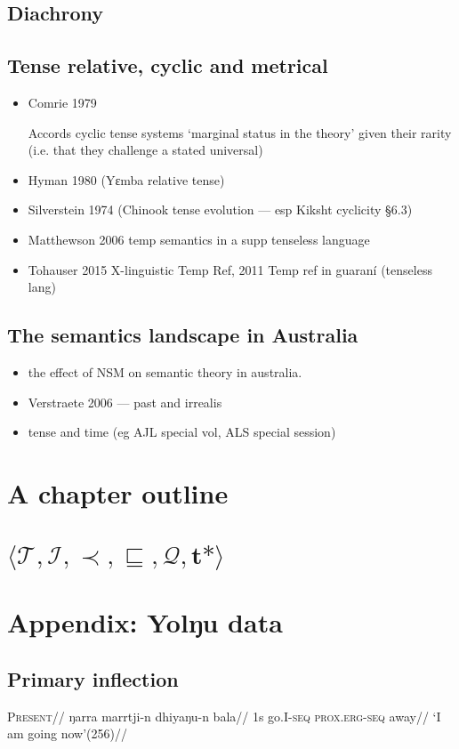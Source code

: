 \documentclass[12pt]{article}
\begin{document}
	\subsection{Diachrony}
	\subsection{Tense relative, cyclic and metrical}\label{tense§}
\begin{itemize}
\item 	Comrie 1979

Accords cyclic tense systems `marginal status in the theory' given their rarity (i.e. that they challenge a stated universal)
\item 	Hyman 1980 (Yɛmba relative tense)
\item Silverstein 1974 (Chinook tense evolution --- esp Kiksht cyclicity §6.3)
\item Matthewson 2006 temp semantics in a supp tenseless language
\item Tohauser 2015 X-linguistic Temp Ref, 2011 Temp ref in guaraní (tenseless lang)
\end{itemize}

	
	
\subsection{The semantics landscape in Australia}
\begin{itemize}
\item the effect of NSM on semantic theory in australia.
\item Verstraete 2006 --- past and irrealis
\item tense and time (eg AJL special vol, ALS special session)


\end{itemize}

\section{A chapter outline}
\section{$\boldsymbol{\langle \mathcal{T},\mathcal{I},\prec,\sqsubseteq,\mathcal{Q},t\!*\rangle}$}
\newpage
\section{Appendix: Yolŋu data}
\subsection{Primary inflection}
\pex\begingl{}
\glpreamble\textsc{Present}//
\gla ŋarra marrtji-n dhiyaŋu-n bala//
\glb 1s go.I-\textsc{seq} \textsc{prox.erg-seq} away//
\glft`I am going now'\hfill(256)//
\endgl\xe
\end{document}
